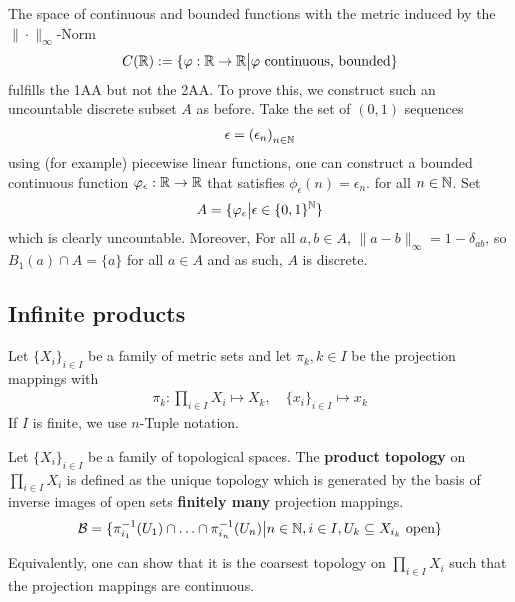 \begin{ex}[]
  The space of continuous and bounded functions with the metric induced by the $\|\cdot\|_{\infty}$-Norm
  \begin{align*}
    C(\mathbb{R}) := \{\varphi:  \mathbb{R} \to \mathbb{R} \big\vert \varphi \text{ continuous, bounded}\}
  \end{align*}
  fulfills the 1AA but not the 2AA.
  To prove this, we construct such an uncountable discrete subset $A$ as before. Take the set of $(0,1)$ sequences
  \begin{align*}
    \epsilon = \left(\epsilon_{n}\right)_{n \in \mathbb{N}}
  \end{align*}
  using (for example) piecewise linear functions, one can construct a bounded continuous function
  $\varphi_{\epsilon}: \mathbb{R} \to \mathbb{R}$ that satisfies $\phi_{\epsilon}(n) = \epsilon_n$.
  for all $n \in \mathbb{N}$.
  Set
  \begin{align*}
    A = \{\varphi_{\epsilon} \big\vert \epsilon \in \{0,1\}^{\mathbb{N}}\}
  \end{align*}
  which is clearly uncountable. 
  Moreover, For all $a,b \in A$, $\|a -b\|_{\infty} = 1 - \delta_{ab}$, so $B_1(a) \cap A = \{a\}$ for all $a \in A$ and as such, $A$ is discrete.
\end{ex}



\subsection{Infinite products}
Let $\{X_i\}_{i \in I}$ be a family of metric sets and let $\pi_k, k \in I$ be the projection mappings with
\begin{align*}
  \pi_k: \prod_{i \in I}X_i \mapsto  X_k, \quad \{x_i\}_{i \in I} \mapsto  x_k
\end{align*}
If $I$ is finite, we use $n$-Tuple notation.


\begin{dfn}[]
Let $\{X_i\}_{i \in I}$ be a family of topological spaces.
The \textbf{product topology} on $\prod_{i \in I}X_i$ is defined as the unique topology which is generated by the basis of inverse images of open sets \textbf{finitely many} projection mappings.
  \begin{align*}
    \mathcal{B} = \{\pi_{i_1}^{-1}(U_1) \cap \ldots \cap \pi_{i_n}^{-1}(U_n) \big\vert n \in \mathbb{N}, i \in I, U_k \subseteq X_{i_k} \text{ open}\}
  \end{align*}
\end{dfn}
Equivalently, one can show that it is the coarsest topology on $\prod_{i \in I} X_i$ such that the projection mappings are continuous.

